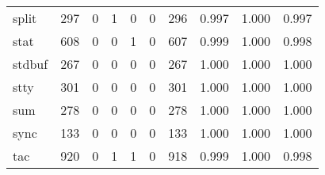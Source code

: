 \begin{longtable}{lp{2.0cm}p{2.0cm}p{2.0cm}p{2.0cm}p{2.0cm}p{2.0cm}p{2.0cm}p{2.0cm}p{2.0cm}}
split     &                    297 &                                  0 &                                 1 &                                0 &                                 0 &                             296 &                                   0.997 &                                  1.000 &                                0.997 \\
stat      &                    608 &                                  0 &                                 0 &                                1 &                                 0 &                             607 &                                   0.999 &                                  1.000 &                                0.998 \\
stdbuf    &                    267 &                                  0 &                                 0 &                                0 &                                 0 &                             267 &                                   1.000 &                                  1.000 &                                1.000 \\
stty      &                    301 &                                  0 &                                 0 &                                0 &                                 0 &                             301 &                                   1.000 &                                  1.000 &                                1.000 \\
sum       &                    278 &                                  0 &                                 0 &                                0 &                                 0 &                             278 &                                   1.000 &                                  1.000 &                                1.000 \\
sync      &                    133 &                                  0 &                                 0 &                                0 &                                 0 &                             133 &                                   1.000 &                                  1.000 &                                1.000 \\
tac       &                    920 &                                  0 &                                 1 &                                1 &                                 0 &                             918 &                                   0.999 &                                  1.000 &                                0.998 \\

\end{longtable}
